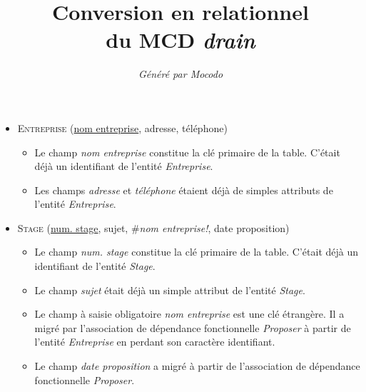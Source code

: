 \documentclass[a4paper]{article}
\title{Conversion en relationnel\\du MCD \emph{drain}}
\author{\emph{Généré par Mocodo}}
\newcommand{\relat}[1]{\textsc{#1}}
\newcommand{\attr}[1]{#1}
\newcommand{\prim}[1]{\uline{#1}}
\newcommand{\foreign}[1]{\#\textsl{#1}}
\begin{document}
\maketitle

\begin{itemize}
  \item \relat{Entreprise} (\prim{nom entreprise}, \attr{adresse}, \attr{téléphone})
  \begin{itemize}
    \item Le champ \emph{nom entreprise} constitue la clé primaire de la table. C'était déjà un identifiant de l'entité \emph{Entreprise}.
    \item Les champs \emph{adresse} et \emph{téléphone} étaient déjà de simples attributs de l'entité \emph{Entreprise}.
  \end{itemize}

  \item \relat{Stage} (\prim{num. stage}, \attr{sujet}, \foreign{nom entreprise!}, \attr{date proposition})
  \begin{itemize}
    \item Le champ \emph{num. stage} constitue la clé primaire de la table. C'était déjà un identifiant de l'entité \emph{Stage}.
    \item Le champ \emph{sujet} était déjà un simple attribut de l'entité \emph{Stage}.
    \item Le champ à saisie obligatoire \emph{nom entreprise} est une clé étrangère. Il a migré par l'association de dépendance fonctionnelle \emph{Proposer} à partir de l'entité \emph{Entreprise} en perdant son caractère identifiant.
    \item Le champ \emph{date proposition} a migré à partir de l'association de dépendance fonctionnelle \emph{Proposer}.
  \end{itemize}


\end{itemize}
\end{document}
